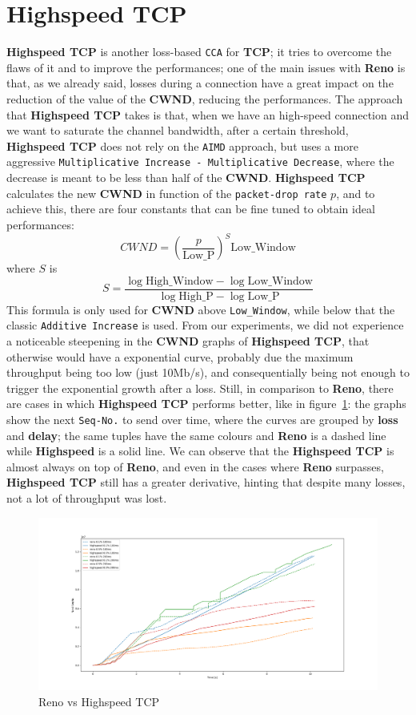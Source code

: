\documentclass{exam}
\begin{document}
\section{Highspeed TCP}
\textbf{Highspeed TCP} is another loss-based \texttt{CCA} for \textbf{TCP}; it tries to overcome the flaws of it and to improve the performances; one of the main issues with \textbf{Reno} is that, as we already said, losses during a connection have a great impact on the reduction of the value of the \textbf{CWND}, reducing the performances. The approach that \textbf{Highspeed TCP} takes is that, when we have an high-speed connection and we want to saturate the channel bandwidth, after a certain threshold, \textbf{Highspeed TCP} does not rely on the \texttt{AIMD} approach, but uses a more aggressive \texttt{Multiplicative Increase - Multiplicative Decrease}, where the decrease is meant to be less than half of the \textbf{CWND}. \textbf{Highspeed TCP} calculates the new \textbf{CWND} in function of the \texttt{packet-drop rate} $p$, and to achieve this, there are four constants that can be fine tuned to obtain ideal performances:
\[
CWND = \left(\frac{p}{\text{Low\_P}}\right)^S \text{Low\_Window}
\]
where $S$ is
\[
S = \frac{\log \text{High\_Window} - \log \text{Low\_Window}}{\log \text{High\_P} - \log \text{Low\_P}}
\]
This formula is only used for \textbf{CWND} above \texttt{Low\_Window}, while below that the classic \texttt{Additive Increase} is used. From our experiments, we did not experience a noticeable steepening in the \textbf{CWND} graphs of \textbf{Highspeed TCP}, that otherwise would have a exponential curve, probably due the maximum throughput being too low (just 10Mb/s), and consequentially being not enough to trigger the exponential growth after a loss. Still, in comparison to \textbf{Reno}, there are cases in which \textbf{Highspeed TCP} performs better, like in figure~\ref{fig:reno-vs-highpseed}: the graphs show the next \texttt{Seq-No.} to send over time, where the curves are grouped by \textbf{loss} and \textbf{delay}; the same tuples have the same colours and \textbf{Reno} is a dashed line while \textbf{Highspeed} is a solid line. We can observe that the \textbf{Highspeed TCP} is almost always on top of \textbf{Reno}, and even in the cases where \textbf{Reno} surpasses, \textbf{Highspeed TCP} still has a greater derivative, hinting that despite many losses, not a lot of throughput was lost.
\begin{figure}[H]
    \centering
    \includegraphics[width=0.75\linewidth]{reno-vs-highspeed-seqno.png}
    \caption{Reno vs Highspeed TCP}
    \label{fig:reno-vs-highpseed}
\end{figure}
\end{document}
